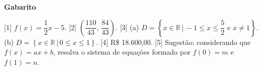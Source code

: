 \documentclass[12pt,a4paper]{article}
\begin{document}
\begin{center}
  \textbf{Gabarito}
\end{center}

[1] $f(x) = \dfrac{1}{2}x - 5$. 
[2] $\left(\dfrac{110}{43},\, \dfrac{84}{43}\right)$. 
[3]
(a) $D = \left\{x\in \mathbb{R}\,|\, -1 \leq x \leq \dfrac{5}{2} \textrm{ e }x \neq 1\right\}$. 
(b) $D = \left\{x\in \mathbb{R}\,|\, 0 \leq x \leq 1\right\}$. 
[4] R\$ 18.600,00. 
[5] Sugestão: considerando que $f(x) = ax + b$, resolva o sistema de equações formado por
$f(0) = m$ e $f(1) = n$. 
\end{document}
